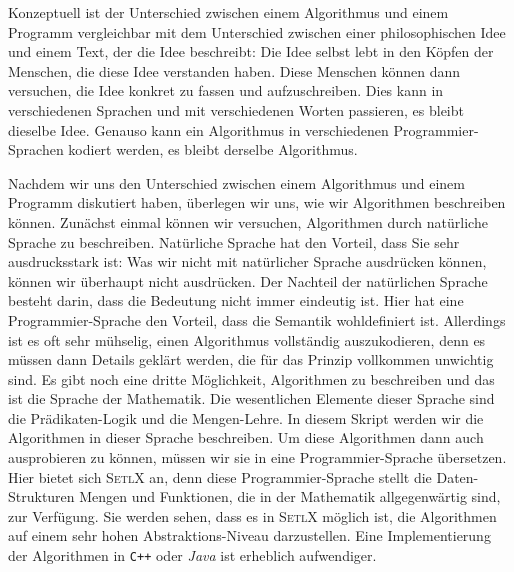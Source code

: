 Konzeptuell ist der Unterschied zwischen einem Algorithmus und einem Programm vergleichbar mit dem
Unterschied zwischen einer philosophischen Idee und einem Text, der die Idee beschreibt: Die Idee
selbst lebt in den K\"opfen der Menschen, die diese Idee verstanden haben.  Diese Menschen k\"onnen dann
versuchen, die Idee konkret zu fassen und aufzuschreiben.  Dies kann in verschiedenen Sprachen und
mit verschiedenen Worten passieren, es bleibt dieselbe Idee.  Genauso kann ein Algorithmus in
verschiedenen Programmier-Sprachen kodiert werden, es bleibt derselbe Algorithmus.

Nachdem wir uns den Unterschied zwischen einem Algorithmus und einem Programm diskutiert haben,
\"uberlegen wir uns, wie wir Algorithmen beschreiben k\"onnen.  Zun\"achst einmal k\"onnen wir versuchen,
Algorithmen durch nat\"urliche Sprache zu beschreiben.  Nat\"urliche Sprache hat den Vorteil, dass Sie
sehr ausdrucksstark ist: Was wir nicht mit nat\"urlicher Sprache ausdr\"ucken k\"onnen, k\"onnen wir
\"uberhaupt nicht ausdr\"ucken.  Der Nachteil der nat\"urlichen Sprache besteht darin, dass die Bedeutung
nicht immer eindeutig ist.  Hier hat eine Programmier-Sprache den Vorteil, dass die Semantik
wohldefiniert ist.  Allerdings ist es oft sehr m\"uhselig, einen Algorithmus vollst\"andig
auszukodieren, denn es m\"ussen dann Details gekl\"art werden, die f\"ur das Prinzip vollkommen unwichtig
sind.  Es gibt noch eine dritte M\"oglichkeit, Algorithmen zu beschreiben und das ist die Sprache der
Mathematik.  Die wesentlichen Elemente dieser Sprache sind die Pr\"adikaten-Logik und die
Mengen-Lehre.  In diesem Skript werden wir die Algorithmen in dieser Sprache beschreiben.  Um diese
Algorithmen dann auch ausprobieren zu k\"onnen, m\"ussen wir sie in eine Programmier-Sprache \"ubersetzen.
Hier bietet sich \textsc{SetlX} an, denn diese Programmier-Sprache stellt die
Daten-Strukturen Mengen und Funktionen, die in der Mathematik allgegenw\"artig sind, zur
Verf\"ugung.  Sie werden sehen, dass es in \textsc{SetlX} m\"oglich ist, die Algorithmen auf
einem sehr hohen Abstraktions-Niveau darzustellen.  Eine Implementierung der Algorithmen
in \texttt{C++} oder \textsl{Java} ist erheblich aufwendiger.


